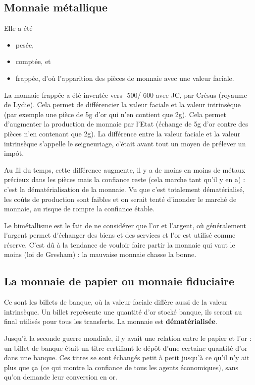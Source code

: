 	\subsection{Monnaie métallique}
		
	Elle a été
		
	\begin{itemize}
		\item pesée,
		\item comptée, et
		\item frappée, d'où l'apparition des pièces de monnaie avec une valeur faciale.
	\end{itemize}
		
	La monnaie frappée a été inventée vers -500/-600 avec JC, par Crésus (royaume de Lydie). Cela permet de différencier la valeur faciale et la valeur intrinsèque (par exemple une pièce de 5g d'or qui n'en contient que 2g). Cela permet d'augmenter la production de monnaie par l'Etat (échange de 5g d'or contre des pièces n'en contenant que 2g). La différence entre la valeur faciale et la valeur intrinsèque s'appelle le seigneuriage, c'était avant tout un moyen de prélever un impôt.
		
	Au fil du temps, cette différence augmente, il y a de moins en moins de métaux précieux dans les pièces mais la confiance reste (cela marche tant qu'il y en a) : c'est la dématérialisation de la monnaie. Vu que c'est totalement dématérialisé, les coûts de production sont faibles et on serait tenté d'inonder le marché de monnaie, au risque de rompre la confiance étable.
		
	Le bimétallisme est le fait de ne considérer que l'or et l'argent, où généralement l'argent permet d'échanger des biens et des services et l'or est utilisé comme réserve. C'est dû à la tendance de vouloir faire partir la monnaie qui vaut le moins (loi de Gresham) : la mauvaise monnaie chasse la bonne.
		
	\subsection{La monnaie de papier ou monnaie fiduciaire}
		
		Ce sont les billets de banque, où la valeur faciale diffère aussi de la valeur intrinsèque. Un billet représente une quantité d'or stocké banque, ils seront au final utilisés pour tous les transferts. La monnaie est \textbf{dématérialisée}.
		
		Jusqu'à la seconde guerre mondiale, il y avait une relation entre le papier et l'or : un billet de banque était un titre certifiant le dépôt d'une certaine quantité d'or dans une banque. Ces titres se sont échangés petit à petit jusqu'à ce qu'il n'y ait plus que ça (ce qui montre la confiance de tous les agents économiques), sans qu'on demande leur conversion en or.
		
